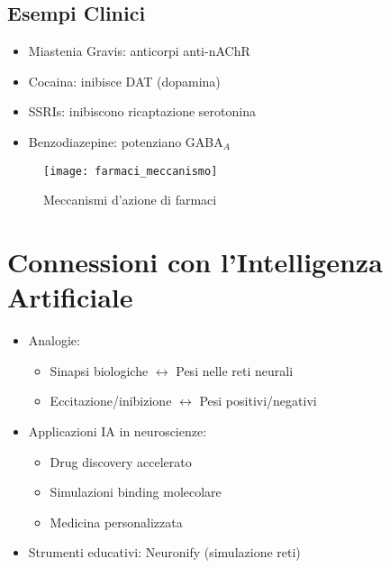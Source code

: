 \documentclass[12pt]{article}
\begin{document}
\subsection{Esempi Clinici}
\begin{itemize}
    \item Miastenia Gravis: anticorpi anti-nAChR
    \item Cocaina: inibisce DAT (dopamina)
    \item SSRIs: inibiscono ricaptazione serotonina
    \item Benzodiazepine: potenziano GABA$_A$
\end{itemize}

\begin{figure}[h]
    \centering
    \texttt{[image: farmaci\_meccanismo]}
    \caption{Meccanismi d'azione di farmaci}
\end{figure}

\section{Connessioni con l'Intelligenza Artificiale}
\begin{itemize}
    \item Analogie:
    \begin{itemize}
        \item Sinapsi biologiche $\leftrightarrow$ Pesi nelle reti neurali
        \item Eccitazione/inibizione $\leftrightarrow$ Pesi positivi/negativi
    \end{itemize}
    \item Applicazioni IA in neuroscienze:
    \begin{itemize}
        \item Drug discovery accelerato
        \item Simulazioni binding molecolare
        \item Medicina personalizzata
    \end{itemize}
    \item Strumenti educativi: Neuronify (simulazione reti)
\end{itemize}
\end{document}
